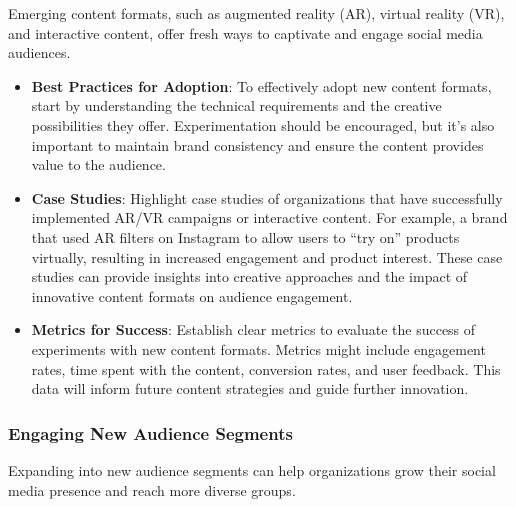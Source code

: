\documentclass[
]{book}
\providecommand{\tightlist}{%
  \setlength{\itemsep}{0pt}\setlength{\parskip}{0pt}}
\begin{document}
Emerging content formats, such as augmented reality (AR), virtual reality (VR), and interactive content, offer fresh ways to captivate and engage social media audiences.

\begin{itemize}
\tightlist
\item
  \textbf{Best Practices for Adoption}: To effectively adopt new content formats, start by understanding the technical requirements and the creative possibilities they offer. Experimentation should be encouraged, but it's also important to maintain brand consistency and ensure the content provides value to the audience.
\item
  \textbf{Case Studies}: Highlight case studies of organizations that have successfully implemented AR/VR campaigns or interactive content. For example, a brand that used AR filters on Instagram to allow users to ``try on'' products virtually, resulting in increased engagement and product interest. These case studies can provide insights into creative approaches and the impact of innovative content formats on audience engagement.
\item
  \textbf{Metrics for Success}: Establish clear metrics to evaluate the success of experiments with new content formats. Metrics might include engagement rates, time spent with the content, conversion rates, and user feedback. This data will inform future content strategies and guide further innovation.
\end{itemize}

\hypertarget{engaging-new-audience-segments}{%
\subsubsection*{Engaging New Audience Segments}\label{engaging-new-audience-segments}}

Expanding into new audience segments can help organizations grow their social media presence and reach more diverse groups.
\end{document}
